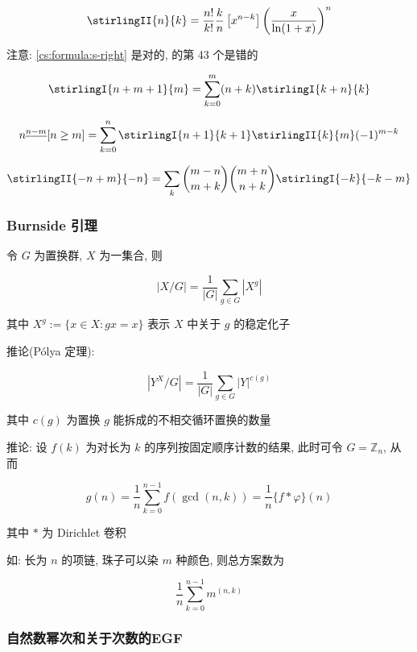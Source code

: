 \begin{equation}
    \stirlingII{n}{k}=\frac{n!}{k!}\frac{k}{n}\left[x^{n-k}\right]\left(\frac{x}{\ln(1+x)}\right)^n
\end{equation}

注意: \eqref{cs:formula:s-right} 是对的,  的第 43 个是错的

\begin{equation}
    \label{cs:formula:s-right}
    \stirlingI{n+m+1}{m}=\sum_{k=0}^m(n+k)\stirlingI{k+n}{k}
\end{equation}

\begin{equation}
    n^{\underline{n-m}}[n\geq m]=\sum_{k=0}^n\stirlingI{n+1}{k+1}\stirlingII{k}{m}(-1)^{m-k}
\end{equation}

\begin{equation}
    \stirlingII{-n+m}{-n}=\sum_k\binom{m-n}{m+k}\binom{m+n}{n+k}\stirlingI{-k}{-k-m}
\end{equation}

\subsubsection{Burnside 引理}

令 \(G\) 为置换群, \(X\) 为一集合, 则

\[
    |X/G|=\frac{1}{|G|}\sum_{g\in G}\left|X^g\right|
\]

其中 \(X^g:=\{x\in X:gx=x\}\) 表示 \(X\) 中关于 \(g\) 的稳定化子

推论(P\'olya 定理):

\[
    \left|Y^X/G\right|=\frac{1}{|G|}\sum_{g\in G} |Y|^{c(g)}
\]

其中 \(c(g)\) 为置换 \(g\) 能拆成的不相交循环置换的数量

推论: 设 \(f(k)\) 为对长为 \(k\) 的序列按固定顺序计数的结果, 此时可令 \(G=\mathbb{Z}_n\), 从而

\[
    g(n)=\frac{1}{n}\sum_{k=0}^{n-1}f(\gcd(n,k))=\frac{1}{n} \{f*\varphi\}(n)
\]

其中 \(*\) 为 Dirichlet 卷积

如: 长为 \(n\) 的项链, 珠子可以染 \(m\) 种颜色, 则总方案数为

\[
    \frac{1}{n}\sum_{k=0}^{n-1} m^{(n,k)}
\]

\subsubsection{自然数幂次和关于次数的EGF}

